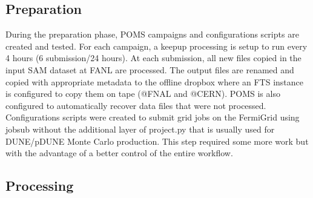\documentclass[pdftex,12pt,letter]{article}
\begin{document}
\subsection {Preparation}

During the preparation phase, POMS campaigns and configurations scripts are created and tested.
For each campaign, a keepup processing is setup to run every 4 hours (6 submission/24 hours).
At each submission, all new files  copied in the input SAM dataset at FANL are processed.
The output files are renamed and copied with appropriate metadata to the offline dropbox where an FTS instance is configured to copy them on tape (@FNAL and @CERN).
POMS is also configured to automatically  recover data files that were not processed.
Configurations scripts were created to submit grid jobs on the FermiGrid using jobsub without the additional layer of project.py  that is usually used for DUNE/pDUNE  Monte Carlo production.
This step required some more work but with the advantage of a better control of the entire workflow.

\subsection {Processing}
\end{document}
